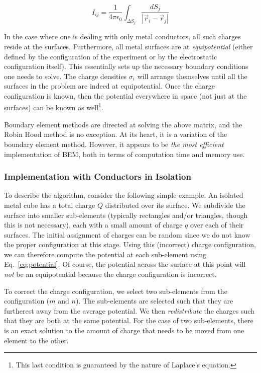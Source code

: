 \begin{equation}
I_{ij} = \frac{1}{4\pi\epsilon_0}\int_{\Delta S_j} \frac{dS_j}{|\vec{r}_i - \vec{r}_j|} 
\end{equation}

In the case where one is dealing with only metal conductors, all such charges reside at the surfaces.  Furthermore, all metal surfaces are at {\em equipotential} (either defined by the configuration of the experiment or by the electrostatic configuration itself).  This essentially sets up the necessary boundary conditions one needs to solve.  The charge densities $\sigma_i$ will arrange themselves until all the surfaces in the problem are indeed at equipotential.  Once the charge configuration is known, then the potential everywhere in space (not just at the surfaces) can be known as well\footnote{This last condition is guaranteed by the nature of Laplace's equation.}.  

Boundary element methods are directed at solving the above matrix, and the Robin Hood method is no exception.  At its heart, it is a variation of the boundary element method.  However, it appears to be {\em the most efficient} implementation of BEM, both in terms of computation time and memory use.  

\subsubsection{Implementation with Conductors in Isolation}

To describe the algorithm, consider the following simple example.  An isolated metal cube has a total charge $Q$ distributed over its surface.  We subdivide the surface into smaller sub-elements (typically rectangles and/or triangles, though this is not necessary), each with a small amount of charge $q$ over each of their surfaces.  The initial assignment of charges can be random since we do not know the proper configuration at this stage.  Using this (incorrect) charge configuration, we can therefore compute the potential at each sub-element using Eq.~\ref{eq:potential}.  Of course, the potential across the surface at this point will {\em not} be an equipotential because the charge configuration is incorrect.

To correct the charge configuration, we select two sub-elements from the configuration ($m$ and $n$).  The sub-elements are selected such that they are furtherest away from the average potential.  We then {\em redistribute} the charges such that they are both at the same potential.  For the case of two sub-elements, there is an exact solution to the amount of charge that needs to be moved from one element to the other.

